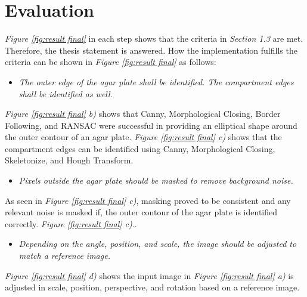 \section{Evaluation}
 \textit{Figure \ref{fig:result final}} in each step shows that the criteria in \textit{Section 1.3} are met. Therefore, the thesis statement is answered. How the implementation fulfills the criteria can be shown in \textit{Figure \ref{fig:result final}} as follows: 
 \begin{itemize}
     \item \textit{The outer edge of the agar plate shall be identified. The compartment edges shall be identified as well. }
 \end{itemize}
\textit{Figure \ref{fig:result final} b)} shows that Canny, Morphological Closing, Border Following, and RANSAC were successful in providing an elliptical shape around the outer contour of an agar plate. \textit{Figure \ref{fig:result final} c)} shows that the compartment edges can be identified using Canny, Morphological Closing, Skeletonize, and Hough Transform. 
  \begin{itemize}
     \item \textit{Pixels outside the agar plate should be masked to remove background noise.}
 \end{itemize}
 As seen in \textit{Figure \ref{fig:result final} c)}, masking proved to be consistent and any relevant noise is masked if, the outer contour of the agar plate is identified correctly.
 \textit{Figure \ref{fig:result final} c)}.. 
  \begin{itemize}
     \item \textit{Depending on the angle, position, and scale, the image should be adjusted to match a reference image.}
 \end{itemize}
 \textit{Figure \ref{fig:result final} d)} shows the input image in \textit{Figure \ref{fig:result final} a)} is adjusted in scale, position, perspective, and rotation based on a reference image.





